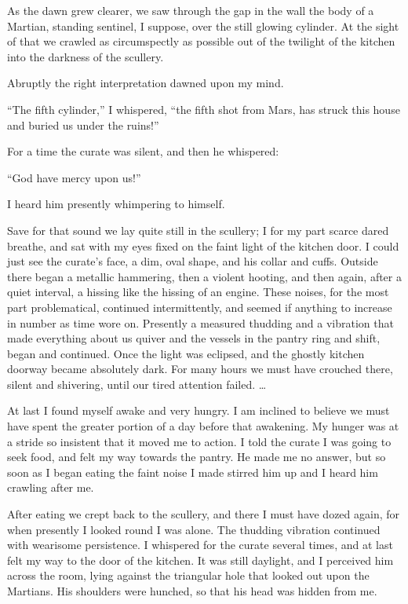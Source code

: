 As the dawn grew clearer, we saw through the gap in the wall the
body of a Martian, standing sentinel, I suppose, over the still
glowing cylinder. At the sight of that we crawled as circumspectly
as possible out of the twilight of the kitchen into the darkness of
the scullery.

Abruptly the right interpretation dawned upon my mind.

``The fifth cylinder,'' I whispered, ``the fifth shot from Mars, has
struck this house and buried us under the ruins!''

For a time the curate was silent, and then he whispered:

``God have mercy upon us!''

I heard him presently whimpering to himself.

Save for that sound we lay quite still in the scullery; I for my
part scarce dared breathe, and sat with my eyes fixed on the faint
light of the kitchen door. I could just see the curate's face, a
dim, oval shape, and his collar and cuffs. Outside there began a
metallic hammering, then a violent hooting, and then again, after a
quiet interval, a hissing like the hissing of an engine. These
noises, for the most part problematical, continued intermittently,
and seemed if anything to increase in number as time wore on.
Presently a measured thudding and a vibration that made everything
about us quiver and the vessels in the pantry ring and shift, began
and continued. Once the light was eclipsed, and the ghostly kitchen
doorway became absolutely dark. For many hours we must have
crouched there, silent and shivering, until our tired attention
failed. \ldots{}

At last I found myself awake and very hungry. I am inclined to
believe we must have spent the greater portion of a day before that
awakening. My hunger was at a stride so insistent that it moved me
to action. I told the curate I was going to seek food, and felt my
way towards the pantry. He made me no answer, but so soon as I
began eating the faint noise I made stirred him up and I heard him
crawling after me.

After eating we crept back to the scullery, and there I must have
dozed again, for when presently I looked round I was alone. The
thudding vibration continued with wearisome persistence. I
whispered for the curate several times, and at last felt my way to
the door of the kitchen. It was still daylight, and I perceived him
across the room, lying against the triangular hole that looked out
upon the Martians. His shoulders were hunched, so that his head was
hidden from me.

